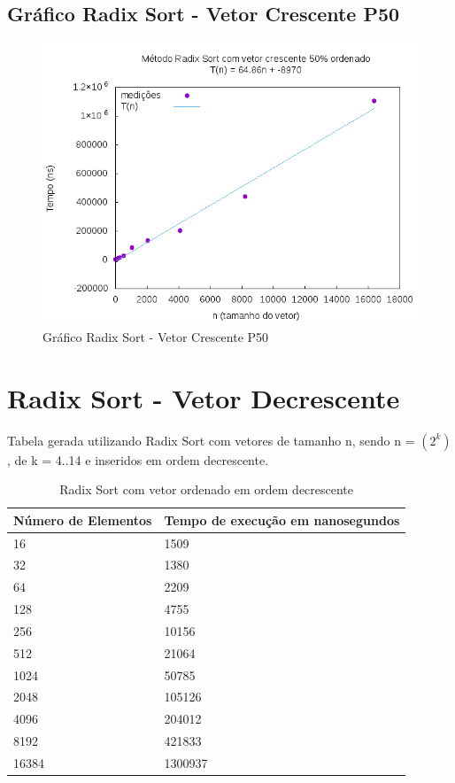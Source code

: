 \documentclass[12pt,a4paper,twoside]{report}
\begin{document}
\subsection{Gráfico Radix Sort - Vetor Crescente P50}
\begin{figure}[H]
    \centering
    \includegraphics[width=0.7\linewidth]{graficos/RadixSort/vIntCrescenteP50/vIntCrescenteP50.png}
  \caption{Gráfico Radix Sort - Vetor Crescente P50}
\end{figure}

\section{Radix Sort - Vetor Decrescente}
Tabela gerada utilizando Radix Sort com vetores de tamanho n, sendo n = $(2^k)$, de k = 4..14 e inseridos em ordem decrescente.
\begin{table}[H]
\centering
\caption{Radix Sort com vetor ordenado em ordem decrescente}
\label{my-label}
\begin{tabular}{|l|l|}
\hline
\multicolumn{1}{|c|}{\textbf{Número de Elementos}} & \multicolumn{1}{c|}{\textbf{Tempo de execução em nanosegundos}} \\ \hline
16 & 1509 \\ \hline
32 & 1380 \\ \hline
64 & 2209 \\ \hline
128 & 4755 \\ \hline
256 & 10156 \\ \hline
512 & 21064 \\ \hline
1024 & 50785 \\ \hline
2048 & 105126 \\ \hline
4096 & 204012 \\ \hline
8192 & 421833 \\ \hline
16384 & 1300937 \\ \hline
\end{tabular}
\end{table}
\end{document}
